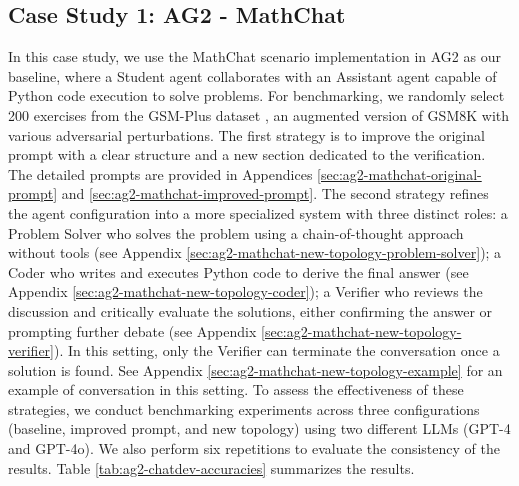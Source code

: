 \subsection{Case Study 1: AG2 - MathChat} 
\label{cs:ag2}

In this case study, we use the MathChat scenario implementation in AG2 \cite{wu2023autogen} as our baseline, where a Student agent collaborates with an Assistant agent capable of Python code execution to solve problems.
For benchmarking, we randomly select 200 exercises from the GSM-Plus dataset \cite{li2024gsm}, an augmented version of GSM8K \cite{cobbe2021training} with various adversarial perturbations. 
The first strategy is to improve the original prompt with a clear structure and a new section dedicated to the verification. 
The detailed prompts are provided in Appendices \ref{sec:ag2-mathchat-original-prompt} and \ref{sec:ag2-mathchat-improved-prompt}.
The second strategy refines the agent configuration into a more specialized system with three distinct roles:
a Problem Solver who solves the problem using a chain-of-thought approach without tools (see Appendix \ref{sec:ag2-mathchat-new-topology-problem-solver});
a Coder who writes and executes Python code to derive the final answer (see Appendix \ref{sec:ag2-mathchat-new-topology-coder});
a Verifier who reviews the discussion and critically evaluate the solutions, either confirming the answer or prompting further debate (see Appendix \ref{sec:ag2-mathchat-new-topology-verifier}). 
In this setting, only the Verifier can terminate the conversation once a solution is found. 
See Appendix \ref{sec:ag2-mathchat-new-topology-example} for an example of conversation in this setting. 
To assess the effectiveness of these strategies, we conduct benchmarking experiments across three configurations (baseline, improved prompt, and new topology) using two different LLMs (GPT-4 and GPT-4o).
We also perform six repetitions to evaluate the consistency of the results. 
Table \ref{tab:ag2-chatdev-accuracies} summarizes the results.
